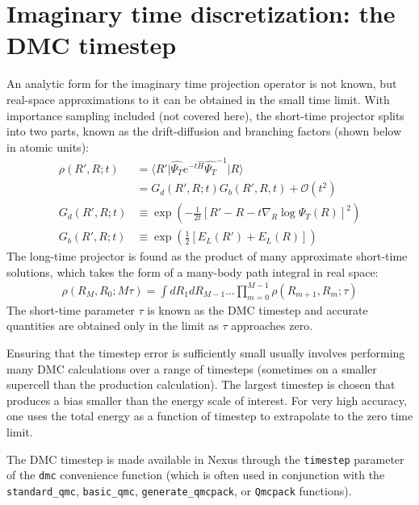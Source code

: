 \documentclass[oneside,11pt]{memoir}
\numberwithin{equation}{section}
\newcommand{\ket}[1]{\lvert #1 \rangle}
\newcommand{\bra}[1]{\langle #1 \rvert}
\newcommand{\expvalnh}[3]{\bra{#1}#2\ket{#3}}
\begin{document}
\section{Imaginary time discretization: the DMC timestep}
An analytic form for the imaginary time projection operator is not known, but 
real-space approximations to it can be obtained in the small time limit.  
With importance sampling included (not covered here), the short-time projector 
splits into two parts, known as the drift-diffusion and branching factors 
(shown below in atomic units):
\begin{align}
   \rho(R',R;t)  &= \expvalnh{R'}{\hat{\Psi_T}e^{-t\hat{H}}\hat{\Psi_T}^{-1}}{R}\\ 
    &= G_d(R',R;t)G_b(R',R,t) +\mathcal{O}(t^2) \\
  G_d(R',R;t) &\equiv \exp{\left(-\tfrac{1}{2t}\left[R'-R-t\nabla_R\log\Psi_T(R)\right]^2\right)} \\
  G_b(R',R;t) &\equiv \exp{\left(\tfrac{1}{2}\left[E_L(R')+E_L(R)\right]\right)}
\end{align}
The long-time projector is found as the product of many approximate short-time 
solutions, which takes the form of a many-body path integral in real space:
\begin{align}
  \rho(R_M,R_0; M\tau) = \int dR_1dR_{M-1}\ldots \prod_{m=0}^{M-1}\rho(R_{m+1},R_m;\tau)
\end{align}
The short-time parameter $\tau$ is known as the DMC timestep and accurate 
quantities are obtained only in the limit as $\tau$ approaches zero.

Ensuring that the timestep error is sufficiently small usually involves 
performing many DMC calculations over a range of timesteps (sometimes on 
a smaller supercell than the production calculation).  The largest timestep 
is chosen that produces a bias smaller than the energy scale of interest.  
For very high accuracy, one uses the total energy as a function of timestep to 
extrapolate to the zero time limit.

The DMC timestep is made available in Nexus through the 
\texttt{timestep} parameter of the \texttt{dmc} convenience function 
(which is often used in conjunction with the \texttt{standard\_qmc},  
\texttt{basic\_qmc}, \texttt{generate\_qmcpack}, or \texttt{Qmcpack} 
functions). 
\end{document}
